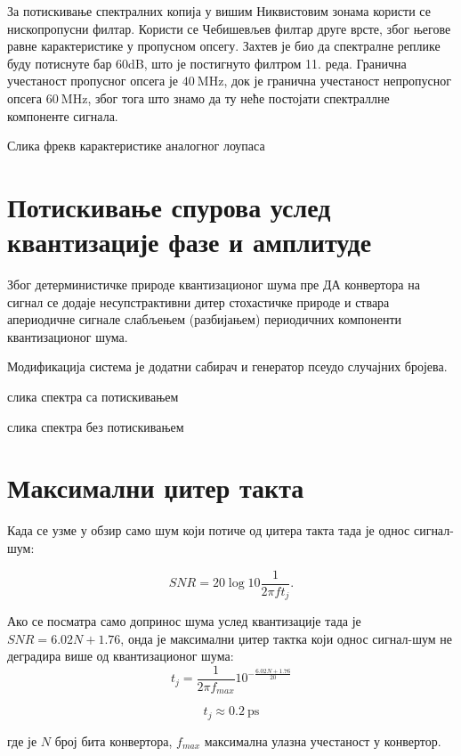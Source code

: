 \documentclass[conference]{IEEEJERM}
\begin{document}
За потискивање спектралних копија у вишим Никвистовим зонама користи се нископропусни филтар. Користи се Чебишевљев филтар друге врсте, због његове равне карактеристике у пропусном опсегу. Захтев је био да спектралне реплике буду потиснуте бар 60dB, што је постигнуто филтром 11. реда. Гранична учестаност пропусног опсега је $\SI{40}{\mega\hertz}$, док је гранична учестаност непропусног опсега $\SI{60}{\mega\hertz}$, због тога што знамо да ту неће постојати спектраллне компоненте сигнала.

Слика фрекв карактеристике аналогног лоупаса


\section{Потискивање спурова услед квантизације фазе и амплитуде}

Због детерминистичке природе квантизационог шума пре ДА конвертора на сигнал се додаје несупстрактивни дитер стохастичке природе и ствара апериодичне сигнале слабљењем (разбијањем) периодичних компоненти квантизационог шума.

Модификација система је додатни сабирач и генератор псеудо случајних бројева.

слика спектра са потискивањем

слика спектра без потискивањем

\section{Максимални џитер такта}

Када се узме у обзир само шум који потиче од џитера такта тада је однос сигнал-шум:

\begin{equation}
SNR=20\log10\frac{1}{2\pi f t_j}.
\end{equation}


Ако се посматра само допринос шума услед квантизације тада је $SNR = 6.02N + 1.76$, онда је максимални џитер тактка који однос сигнал-шум не деградира више од квантизационог шума:
\begin{equation}
t_j = \frac{1}{2 \pi f_{max}} 10^{-\frac{6.02N +1.76}{20}}
\end{equation}


\begin{equation}
t_j \approx  \SI{0.2}{\pico\s}
\end{equation}

\noindent где је $N$ број бита конвертора,  $f_{max}$ максимална улазна учестаност у конвертор.
\end{document}
